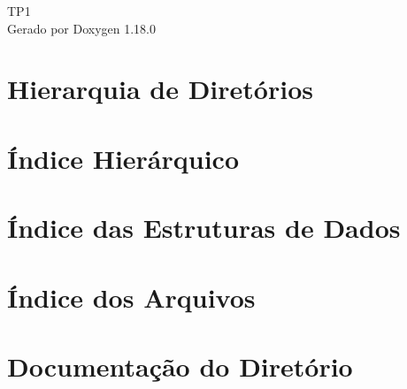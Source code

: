 \documentclass[twoside]{book}
\newcommand{\+}{\discretionary{\mbox{\scriptsize$\hookleftarrow$}}{}{}}
\newcommand{\clearemptydoublepage}{%
    \newpage{\pagestyle{empty}\cleardoublepage}%
  }
\begin{document}
  \raggedbottom
    \hypersetup{pageanchor=false,
                bookmarksnumbered=true,
                pdfencoding=unicode
               }
  \begin{titlepage}
  \vspace*{7cm}
  \begin{center}%
  {\Large TP1}\\
  \vspace*{1cm}
  {\large Gerado por Doxygen 1.18.0}\\
  \end{center}
  \end{titlepage}
  \clearemptydoublepage
  \tableofcontents
  \clearemptydoublepage
  \hypersetup{pageanchor=true}
\chapter{Hierarquia de Diretórios}

\chapter{Índice Hierárquico}

\chapter{Índice das Estruturas de Dados}

\chapter{Índice dos Arquivos}

\chapter{Documentação do Diretório}








\end{document}
